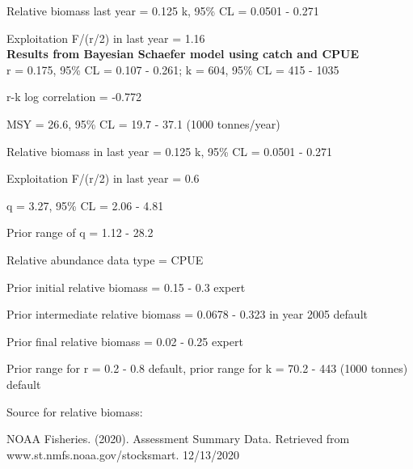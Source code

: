 \documentclass[12pt,a4paper]{article}\usepackage[]{graphicx}\usepackage[]{xcolor}
\begin{document}
Relative biomass last year = 0.125 k, 95\% CL = 0.0501 - 0.271

Exploitation F/(r/2) in last year = 1.16 \\

\textbf{Results from Bayesian Schaefer model using catch and CPUE}\\

r = 0.175, 95\% CL = 0.107 - 0.261; k = 604, 95\% CL = 415 - 1035

r-k log correlation = -0.772

MSY = 26.6, 95\% CL = 19.7 - 37.1 (1000 tonnes/year)

Relative biomass in last year = 0.125 k, 95\% CL = 0.0501 - 0.271

Exploitation F/(r/2) in last year = 0.6

q = 3.27, 95\% CL = 2.06 - 4.81

Prior range of q = 1.12 - 28.2

Relative abundance data type = CPUE

Prior initial relative biomass = 0.15 - 0.3 expert

Prior intermediate relative biomass = 0.0678 - 0.323 in year 2005 default

Prior final relative biomass = 0.02 - 0.25 expert

Prior range for r = 0.2 - 0.8 default, prior range for k = 70.2 - 443 (1000 tonnes) default

Source for relative biomass: 

NOAA Fisheries. (2020). Assessment Summary Data. Retrieved from www.st.nmfs.noaa.gov/stocksmart. 12/13/2020

    
\end{document}
